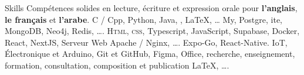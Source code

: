 \begin{rubric}{Skills}
    \entry*[Langues]
    Compétences solides en lecture, écriture et expression orale pour \textbf{l'anglais}, \textbf{le français} et \textbf{l'arabe}.
    C / Cpp, Python, Java, , \LaTeX, \ldots
    My, Postgre, ite, MongoDB, Neo4j, Redis, \ldots.
    \textsc{Html, css}, Typescript, JavaScript, Supabase, Docker, React, NextJS, Serveur Web Apache / Nginx, \ldots.
    Expo-Go, React-Native.
    \entry*[Divers]
    IoT, Électronique et Arduino, Git et GitHub, Figma, Office, recherche, enseignement, formation, consultation, composition et publication \LaTeX, \ldots.
\end{rubric}
